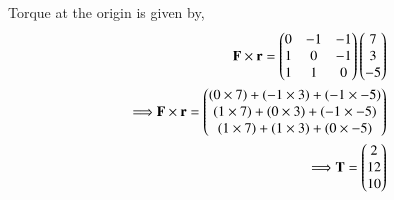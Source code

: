 \documentclass[journal,12pt,twocolumn]{IEEEtran}
\begin{document}
Torque at the origin is given by,
\begin{align}
\mathbf{F \times r} = \begin{pmatrix}0 & -1 & -1\\ 1& 0 &-1 \\ 1 & 1 & 0 \end{pmatrix} \begin{pmatrix}7\\3\\-5\end{pmatrix}  
\\
\Longrightarrow\mathbf{F \times r} = \begin{pmatrix}(0 \times 7)  +  (-1 \times 3)  +  (-1 \times -5)\\(1 \times 7)  +  (0 \times 3)  +  (-1 \times -5)\\(1 \times 7)  +  (1 \times 3)  + (0 \times -5)\end{pmatrix} 
\\
\Longrightarrow \mathbf{T} = \begin{pmatrix}2 \\  12  \\ 10 \end{pmatrix}
\end{align}
\end{document}

